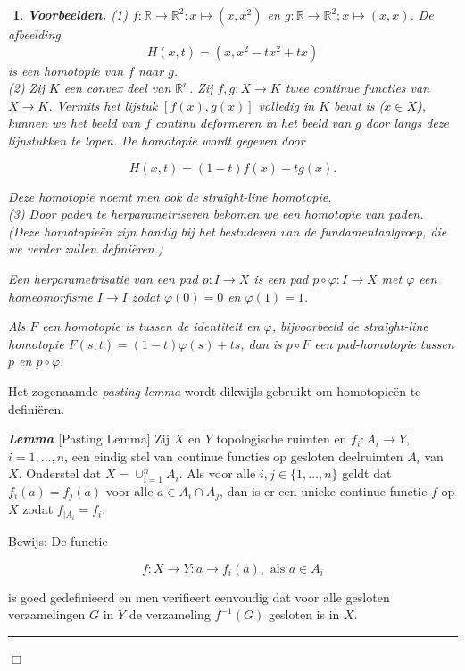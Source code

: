 \documentclass[12pt]{book}
\newcommand{\R}{\mathbb{R}}
\newcommand{\bew}{{\sc Bewijs: }}
\newcommand{\B}{\rule{1mm}{0mm} \hfill $\Box$ }
\newenvironment{lem}{\begin{lemh}{\em {\bf Lemma }}}{\end{lemh}}
\newtheorem{vbnh}[stelh]{$\!\!$}
\newenvironment{vbn}{\begin{vbnh} \em {\bf Voorbeelden.}}{\end{vbnh}}
\begin{document}
\begin{vbn} \label{vb1deel2} (1) $f:\R \to \R^2: x\mapsto (x,x^2)$ en $g:\R \to \R^2; x\mapsto (x,x)$. De afbeelding
$$H(x,t)=(x,x^2-tx^2+tx)$$
is een homotopie van $f$ naar $g$.\\

(2) Zij $K$ een convex deel van $\R^n$. Zij $f,g:X\to K$ twee continue functies van $X\to K$.
Vermits het lijstuk $[f(x),g(x)]$ volledig in $K$ bevat is ($x \in X$), kunnen we het beeld van $f$
continu deformeren in het beeld van $g$ door langs deze lijnstukken te lopen. De homotopie wordt gegeven door

$$H(x,t)=(1-t)f(x)+tg(x).$$

Deze homotopie noemt men ook de {\em straight-line} homotopie.\\

(3) Door paden te {\em herparametriseren} bekomen we een homotopie van paden. (Deze homotopie\"en zijn handig bij het bestuderen van de fundamentaalgroep, die we verder zullen defini\"eren.)

Een {\em herparametrisatie} van een pad $p:I\to X$ is een pad $p\circ \varphi: I\to X$ met $\varphi$ een homeomorfisme $I\to I$ zodat $\varphi(0)=0$ en $\varphi(1)=1$.

Als $F$ een homotopie is tussen de identiteit en $\varphi$, bijvoorbeeld de straight-line homotopie $F(s,t)=(1-t)\varphi(s)+ts$, dan is
$p\circ F$ een pad-homotopie tussen $p$ en $p \circ \varphi$.
\end{vbn}

Het zogenaamde {\em pasting lemma} wordt dikwijls gebruikt om homotopie\"en te defini\"eren.

\begin{lem}{\rm [Pasting Lemma]} 
Zij $X$ en $Y$  topologische ruimten en $f_i:A_i\to Y$, $i=1, \ldots , n$, een eindig stel van continue functies 
op gesloten deelruimten $A_i$ van $X$. Onderstel dat $X=\cup_{i=1}^{n} A_i$. Als voor alle $i, j\in \{1, \ldots, n\}$ geldt dat
$f_{i} (a)=f_{j}(a)$ voor alle $a\in A_i\cap A_j$, dan is er een unieke continue functie $f$ op $X$ zodat 
$f_{|A_i}=f_i$. \label{pasting}
\end{lem}

\bew De functie 

$$f:X\to Y: a \to f_i(a), \mbox{ als } a\in A_i$$

is goed gedefinieerd en men verifieert eenvoudig dat voor alle gesloten verzamelingen $G$ in $Y$ de verzameling $f^{-1}(G)$ gesloten is in $X$. \B
\end{document}
